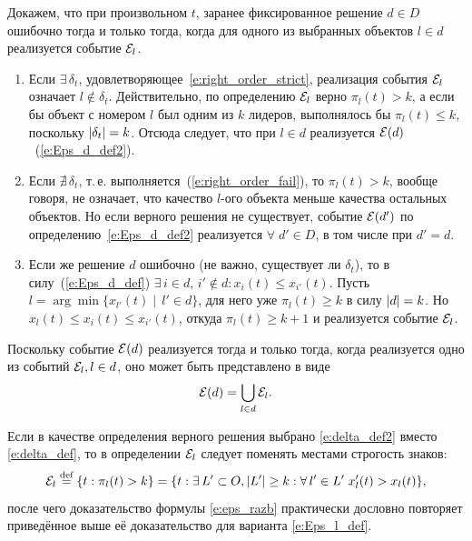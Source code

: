 Докажем, что при произвольном $t$, заранее фиксированное решение $d \in D$ ошибочно тогда и только тогда, когда для одного из выбранных объектов $l \in d$ реализуется событие $\mathcal{E}_l$.
\begin{enumerate}
  \item Если $\exists\, \delta_t$, удовлетворяющее~\eqref{e:right_order_strict}, реализация события $\mathcal{E}_l$ означает $l \notin \delta_t$.
  Действительно, по определению $\mathcal{E}_l$ верно $\pi_l(t) > k$, а если бы объект с номером $l$ был одним из $k$ лидеров, выполнялось бы $\pi_l(t) \leq k$, поскольку $\left| \delta_t \right| = k$. Отсюда следует, что при $l \in d$ реализуется $\mathcal{E}(d)$~(\ref{e:Eps_d_def2}).
  \item Если $\nexists\, \delta_t$, т.\,е. выполняется~(\ref{e:right_order_fail}), то $\pi_l(t) > k$, вообще говоря, не означает, что качество $l$-ого объекта меньше качества остальных объектов. Но если верного решения не существует, событие $\mathcal{E}(d')$ по определению~\eqref{e:Eps_d_def2} реализуется $\forall\; d' \in D$, в том числе при $d' = d$. 
  \item Если же решение $d$ ошибочно (не важно, существует ли $\delta_t$), то в силу~(\ref{e:Eps_d_def}) $\exists\, i \in d,\, i' \notin d: x_i(t) \leq x_{i'}(t)$. %
  Пусть $l = \arg\min \{x_{l'}(t)\mid\,l' \in d\}$, для него уже $\pi_l(t) \geq k$ в силу $\left| d \right| = k$. Но $x_l(t) \leq x_i(t) \leq x_{i'}(t)$, откуда $\pi_l(t) \geq k+1$ и реализуется событие $\mathcal{E}_l$.     
\end{enumerate}

Поскольку событие $\mathcal{E}(d)$ реализуется тогда и только тогда, когда реализуется одно из событий $\mathcal{E}_l, l \in d$, оно может быть представлено в виде
\begin{equation}
  \label{e:eps_razb}
  \mathcal{E}(d) = \bigcup_{l \in d} \mathcal{E}_l.
\end{equation}

\begin{notice}
Если в качестве определения верного решения выбрано \eqref{e:delta_def2} вместо \eqref{e:delta_def}, то в определении $\mathcal{E}_l$ следует поменять местами строгость знаков:
\begin{equation*}
  \mathcal{E}_l \overset{\text{def}}{=} \{t: \pi_l(t) > k\} = \{t: \exists\, L' \subset O, \left| L' \right| \geq k: \forall\, l' \in L'\;x_l'(t) > x_{l}(t)\},
\end{equation*}
после чего доказательство формулы \eqref{e:eps_razb} практически дословно повторяет приведённое выше её доказательство для варианта \eqref{e:Eps_l_def}.
\end{notice}

